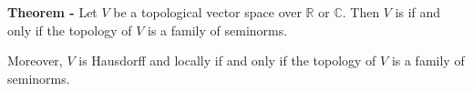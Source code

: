 \documentclass[12pt]{article}
\begin{document}
{\bf Theorem -} Let $V$ be a topological vector space over $\mathbb{R}$ or $\mathbb{C}$. Then $V$ is  if and only if the topology of $V$ is  a family of seminorms.

Moreover, $V$ is Hausdorff and locally  if and only if the topology of $V$ is  a  family of seminorms.
\end{document}
